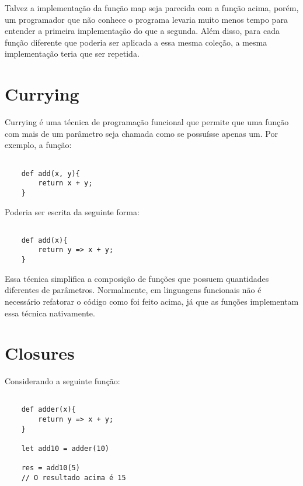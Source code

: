Talvez a implementação da função map seja parecida 
com a função acima, porém, um programador que não 
conhece o programa levaria muito menos tempo para 
entender a primeira implementação do que a segunda. 
Além disso, para cada função diferente que poderia 
ser aplicada a essa mesma coleção, a mesma 
implementação teria que ser repetida.




\section{Currying}

Currying é uma técnica de programação funcional que 
permite que uma função com mais de um parâmetro seja 
chamada como se possuísse apenas um\cite{realworldhaskell, functionalscala}. 
Por exemplo, a função:

\begin{lstlisting}[caption={Exemplo sem Currying},label=nocurrex]

    def add(x, y){
        return x + y;
    }

\end{lstlisting}

Poderia ser escrita da seguinte forma:

\begin{lstlisting}[caption={Exemplo de Currying},label=currex]

    def add(x){
        return y => x + y;
    }

\end{lstlisting}

Essa técnica simplifica a composição de funções 
que possuem quantidades diferentes de parâmetros. 
Normalmente, em linguagens funcionais não é 
necessário refatorar o código como foi feito 
acima, já que as funções implementam essa técnica 
nativamente\cite{realworldhaskell}.



\section{Closures}

Considerando a seguinte função:

\begin{lstlisting}[caption={Exemplo de Closure},label=closureex]

    def adder(x){
        return y => x + y;
    }

    let add10 = adder(10)

    res = add10(5)
    // O resultado acima é 15


\end{lstlisting}

